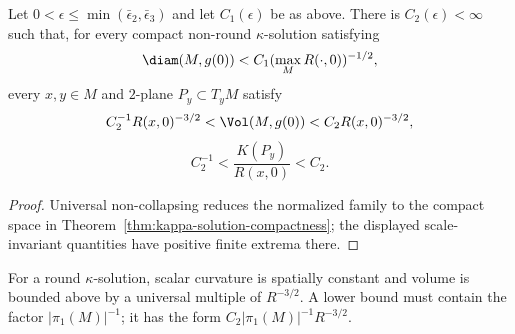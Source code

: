 \begin{proposition}\label{prop:compact-kappa-solution-volume-curvature-bounds}
Let $0<\epsilon\leq\min(\bar\epsilon_2,\bar\epsilon_3)$ and let
$C_1(\epsilon)$ be as above. There is $C_2(\epsilon)<\infty$ such
that, for every compact non-round $\kappa$-solution satisfying
\[
 \diam(M,g(0))<C_1(\max_MR(\cdot,0))^{-1/2},
\]
every $x,y\in M$ and $2$-plane $P_y\subset T_yM$ satisfy
\[
 C_2^{-1}R(x,0)^{-3/2}<\Vol(M,g(0))
 <C_2R(x,0)^{-3/2},
\]
\[
 C_2^{-1}<\frac{K(P_y)}{R(x,0)}<C_2.
\]
\end{proposition}
\begin{proof}
\sketch
{}
Universal non-collapsing reduces the normalized family to the compact
space in Theorem~\ref{thm:kappa-solution-compactness}; the displayed
scale-invariant quantities have positive finite extrema there.
\end{proof}

\begin{remark}\label{rem:round-kappa-solution-volume-remark}
For a round $\kappa$-solution, scalar curvature is spatially
constant and volume is bounded above by a universal multiple of
$R^{-3/2}$. A lower bound must contain the factor
$|\pi_1(M)|^{-1}$; it has the form
$C_2|\pi_1(M)|^{-1}R^{-3/2}$.
\end{remark}

